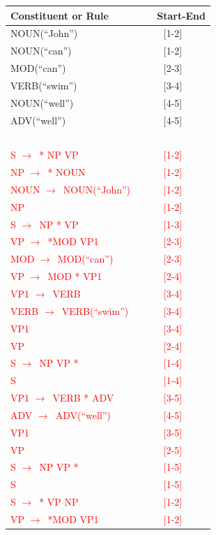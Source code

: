 \documentclass[11pt]{article}
\newcommand{\ra}{$\rightarrow$~}
\begin{document}
\begin{enumerate}
\begin{center}
 \begin{tabular}{lc} 
 {\bf Constituent or Rule~~~} & {\bf ~~~Start-End} \\ \hline
 NOUN(``John'') &  [1-2] \\
 NOUN(``can'') & [1-2] \\
 MOD(``can'') & [2-3] \\
 VERB(``swim'') & [3-4] \\
 NOUN(``well'') & [4-5] \\
 ADV(``well'') & [4-5] \\
 ~ & ~ \\
 \textcolor{red}{S \ra * NP VP} & \textcolor{red}{[1-2]}\\
 \textcolor{red}{NP \ra * NOUN} & \textcolor{red}{[1-2]}\\
 \textcolor{red}{NOUN \ra NOUN(``John'')} & \textcolor{red}{[1-2]}\\
 \textcolor{red}{NP} & \textcolor{red}{[1-2]}\\
 \textcolor{red}{S \ra NP * VP} & \textcolor{red}{[1-3]}\\
 \textcolor{red}{VP \ra *MOD VP1} & \textcolor{red}{[2-3]}\\
 \textcolor{red}{MOD \ra  MOD(``can'')} & \textcolor{red}{[2-3]}\\
 \textcolor{red}{VP \ra MOD * VP1} & \textcolor{red}{[2-4]}\\
 \textcolor{red}{VP1 \ra VERB} & \textcolor{red}{[3-4]}\\
 \textcolor{red}{VERB \ra VERB(``swim'')} & \textcolor{red}{[3-4]}\\
 \textcolor{red}{VP1} & \textcolor{red}{[3-4]}\\
 \textcolor{red}{VP} & \textcolor{red}{[2-4]}\\
 \textcolor{red}{S \ra NP VP *} & \textcolor{red}{[1-4]}\\
 \textcolor{red}{S} & \textcolor{red}{[1-4]}\\
 \textcolor{red}{VP1 \ra VERB * ADV} & \textcolor{red}{[3-5]}\\
 \textcolor{red}{ADV \ra ADV(``well'')} & \textcolor{red}{[4-5]}\\
 \textcolor{red}{VP1} & \textcolor{red}{[3-5]}\\
 \textcolor{red}{VP} & \textcolor{red}{[2-5]}\\
 \textcolor{red}{S \ra NP VP *} & \textcolor{red}{[1-5]}\\
 \textcolor{red}{S} & \textcolor{red}{[1-5]}\\
 \textcolor{red}{S \ra * VP NP} & \textcolor{red}{[1-2]}\\
 \textcolor{red}{VP \ra *MOD VP1} & \textcolor{red}{[1-2]}\\
 \end{tabular}
 \end{center}



\end{enumerate}
\end{document}
